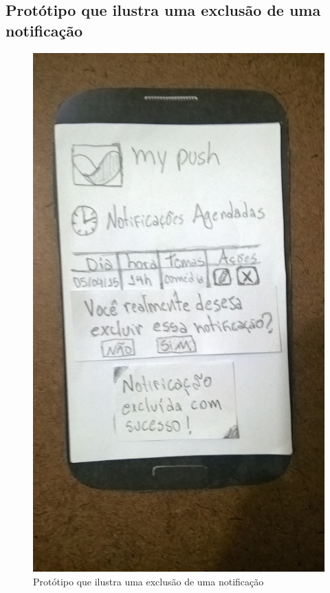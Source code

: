 \begin{anexosenv}
  \pagebreak
  \section*{Protótipo que ilustra uma exclusão de uma notificação}

    \begin{figure}[!htbp]
      \centering
      \includegraphics[scale=0.32, angle=-90]{editaveis/figuras/prototipo_papel_v2/confirmacao_exclusao_notificacao}
      \caption{Protótipo que ilustra uma exclusão de uma notificação}
      \label{confirmacao_exclusao_notificacao_v2}
    \end{figure}
  

\end{anexosenv}
